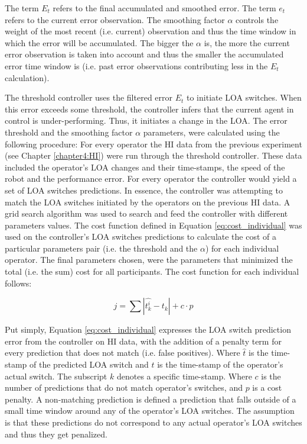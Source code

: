 \documentclass[a4paper,12pt,oneside,openright]{bhamthesis}
\begin{document}
The term $E_{t}$ refers to the final accumulated and smoothed error. The term $e_{t}$ refers to the current error observation. The smoothing factor $\alpha$ controls the weight of the most recent (i.e. current) observation and thus the time window in which the error will be accumulated. The bigger the $\alpha$ is, the more the current error observation is taken into account and thus the smaller the accumulated error time window is (i.e. past error observations contributing less in the $E_{t}$ calculation). 

The threshold controller uses the filtered error $E_{t}$ to initiate LOA switches. When this error exceeds some threshold, the controller infers that the current agent in control is under-performing. Thus, it initiates a change in the LOA. The error threshold and the smoothing factor $\alpha$ parameters, were calculated using the following procedure: For every operator the HI data from the previous experiment (see Chapter \ref{chapter4:HI}) were run through the threshold controller. These data included the operator's LOA changes and their time-stamps, the speed of the robot and the performance error. For every operator the controller would yield a set of LOA switches predictions. In essence, the controller was attempting to match the LOA switches initiated by the operators on the previous HI data. A grid search algorithm was used to search and feed the controller with different parameters values. The cost function defined in Equation \ref{eq:cost_individual} was used on the controller's LOA switches predictions to calculate the cost of a particular parameters pair (i.e. the threshold and the $\alpha$) for each individual operator. The final parameters chosen, were the parameters that minimized the total (i.e. the sum) cost for all participants. The cost function for each individual follows:

\begin{equation}\label{eq:cost_individual}
j = \sum{|\hat{t^{i}_k} - t_k|} + c \cdot p
\end{equation}

Put simply, Equation \ref{eq:cost_individual} expresses the LOA switch prediction error from the controller on HI data, with the addition of a penalty term for every prediction that does not match (i.e. false positives). Where $\hat{t}$ is the time-stamp of the predicted LOA switch and $t$ is the time-stamp of the operator's actual switch. The subscript $k$ denotes a specific time-stamp. Where $c$ is the number of predictions that do not match operator's switches, and $p$ is a cost penalty. A non-matching prediction is defined a prediction that falls outside of a small time window around any of the operator's LOA switches. The assumption is that these predictions do not correspond to any actual operator's LOA switches and thus they get penalized. 
\end{document}
